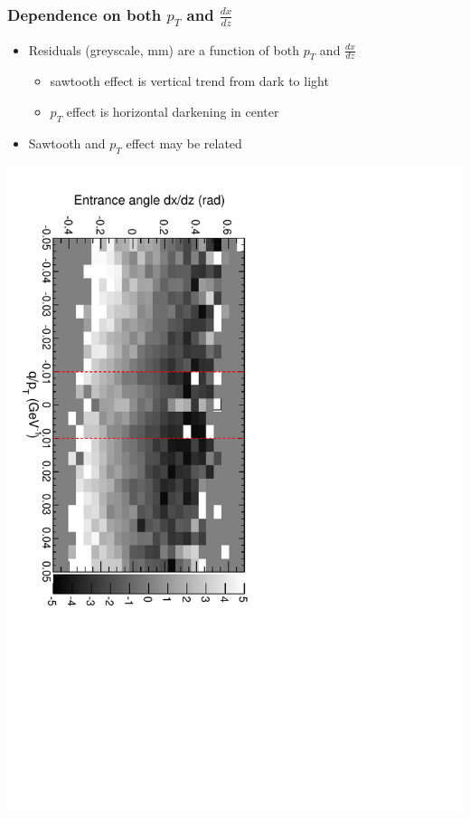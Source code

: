 \documentclass[compress]{beamer}
\begin{document}
\begin{frame}
\frametitle{Dependence on both $p_T$ and $\frac{dx}{dz}$}

\begin{itemize}
\item Residuals (greyscale, mm) are a function of both $p_T$ and $\frac{dx}{dz}$
\begin{itemize}\setlength{\itemsep}{0.1 cm}
\item sawtooth effect is vertical trend from dark to light
\item $p_T$ effect is horizontal darkening in center
\end{itemize}
\item Sawtooth and $p_T$ effect may be related
\end{itemize}
\includegraphics[height=\linewidth, angle=90]{sawtooth_qoverpt_complicated2.pdf}
\end{frame}
\end{document}
